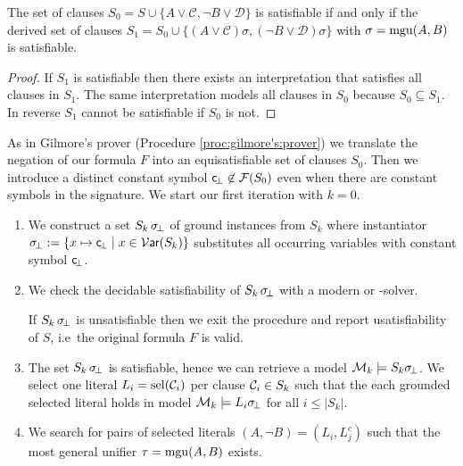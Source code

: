 \begin{lemma}
	The set of clauses 
	$S_0 = S \cup
	\{ 
		 A\lor\mathcal C, \lnot B\lor\mathcal D
	\}$ 
	is satisfiable if and only if
	the derived set of clauses 
	$S_1 = S_0 \cup \{ (A\lor\mathcal C)\sigma, (\lnot B\lor\mathcal D)\sigma\}$
	with $\sigma = \operatorname{mgu}(A,B)$ is satisfiable.
\end{lemma}

\begin{proof}
	If $S_1$ is satisfiable then there exists an interpretation that satisfies all clauses in $S_1$. 
	The same interpretation models all clauses in $S_0$ because $S_0\subseteq S_1$.
	In reverse $S_1$ cannot be satisfiable if $S_0$ is not.
	
	
\end{proof}

\begin{procedure}\label{proc:inst:gen:loop}
	As in Gilmore's prover (Procedure \ref{proc:gilmore's:prover}) 
	we translate the negation of our formula $F$ into an equisatisfiable set of clauses 
	$S_0$. Then we introduce a distinct constant symbol 
	${\mathsf c}\!_\bot\not\in{\mathcal F}(S_0)$ even when there are constant symbols in the signature. 
	We start our first iteration with $k=0$.
	
	\begin{enumerate}
		\item\label{step:igl:skbot}
		We construct a set $S_{k}\,\sigma\!_\bot$ of ground instances from $S_k$
		where instantiator $\sigma\!_\bot := \{ x\mapsto {\mathsf c}\!_\bot \mid x\in\operatorname{\mathcal{V}\mathsf{ar}}(S_k) \} $ 
		substitutes all occurring variables with constant symbol ${\mathsf c}\!_\bot$.
%		
		\item\label{step:igl:sksat} We check the decidable satisfiability of $S_k\,\sigma\!_\bot$ 
		with a modern \SAT or \SMT-solver.
		
		If $S_k\,\sigma\!_\bot$ is unsatisfiable then we exit the procedure and report {\myem usatisfiability} of $S$, i.e~the original formula $F$ is valid.
		
		\item\label{step:igl:model} The set $S_k\,\sigma\!_\bot$ is satisfiable, hence we can retrieve a model ${\mathcal M}_k \models S_k\sigma\!_\bot$.
		We select one literal $L_i = \operatorname{sel}({\mathcal C}_i)$ per clause ${\mathcal C}_i \in S_k$ 
		such that the each grounded selected literal holds in model
		${\mathcal M}_k\models L_i\sigma\!_\bot$ for all $i\leq | S_k |$.
		
		\item\label{step:igl:clashes} We search for pairs of selected literals $(A, \lnot B) = (L_i, L_j^c)$
		such that the most general unifier $\tau = \operatorname{mgu}(A,B)$ exists.
		

\end{enumerate}
\end{procedure}
